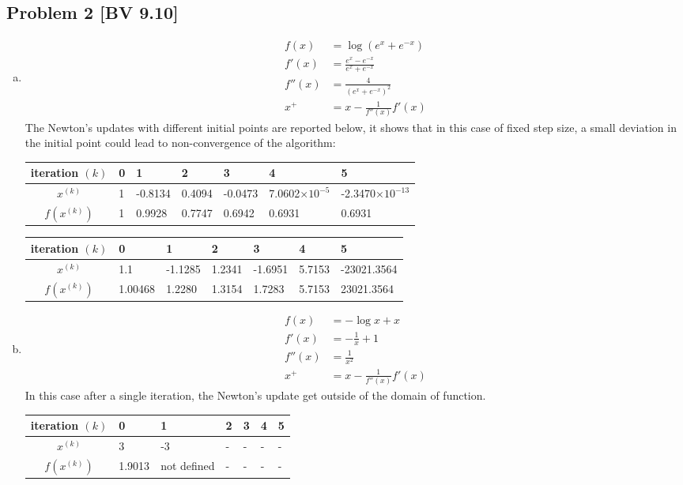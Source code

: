 \documentclass[12pt, letterpaper, twoside]{article}
\begin{document}
\subsection*{Problem 2 \small[BV 9.10]}
\begin{enumerate}[(a)]
    \item 
        \begin{align*}
            f(x) &= \log(e^x+e^{-x})\\
            f'(x) &= \frac{e^x-e^{-x}}{e^x+e^{-x}}\\
            f''(x) &= \frac{4}{(e^x+e^{-x})^2}\\
            x^+&=x-\frac{1}{f''(x)} f'(x)
        \end{align*}
    The Newton's updates with different initial points are reported below, it shows that in this case of fixed step size, a small deviation in the initial point could lead to non-convergence of the algorithm:
    
    \begin{table}[h]
    \centering
    \begin{tabular}{c|l|l|l|l|l|l}
     iteration $(k)$& 0 & 1 & 2 & 3 & 4 & 5  \\\hline
     $x^{(k)}$& 1 & -0.8134 & 0.4094 & -0.0473 & 7.0602$\times10^{-5}$ & -2.3470$\times10^{-13}$ \\
     \hline
     $f(x^{(k)})$& 1 & 0.9928 & 0.7747 & 0.6942 & 0.6931 & 0.6931
    \end{tabular}
    \end{table}

    \begin{table}[h]
    \centering
    \begin{tabular}{c|l|l|l|l|l|l}
     iteration $(k)$& 0 & 1 & 2 & 3 & 4 & 5  \\\hline
     $x^{(k)}$& 1.1 & -1.1285 & 1.2341 & -1.6951 & 5.7153 & -23021.3564 \\
     \hline
     $f(x^{(k)})$& 1.00468 & 1.2280 & 1.3154 & 1.7283 & 5.7153 & 23021.3564
    \end{tabular}
    \end{table}
    
    \item
        \begin{align*}
            f(x) &= -\log x + x\\
            f'(x) &= -\frac{1}{x} + 1\\
            f''(x) &= \frac{1}{x^2}
            \\
            x^+&=x-\frac{1}{f''(x)} f'(x)
        \end{align*}
    In this case after a single iteration, the Newton's update get outside of the domain of function.
    \begin{table}[h]
    \centering
    \begin{tabular}{c|l|l|l|l|l|l}
     iteration $(k)$& 0 & 1 & 2 & 3 & 4 & 5  \\\hline
     $x^{(k)}$& 3 & -3 & - & - & - & - \\
     \hline
     $f(x^{(k)})$& 1.9013 & not defined & - & - & - & -
    \end{tabular}
    \end{table}
    
\end{enumerate}
\end{document}

